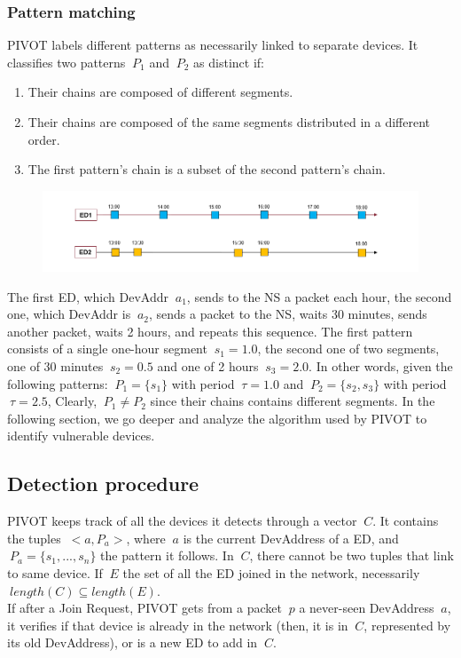 \vspace{5mm} %

\subsubsection{Pattern matching}
PIVOT labels different patterns as necessarily linked to separate devices. It classifies two patterns \(\ P_{1} \) and \(\ P_{2} \) as distinct if:
\begin{enumerate}
	\item Their chains are composed of different segments. 
	\item Their chains are composed of the same segments distributed in a different order.
	\item The first pattern's chain is a subset of the second pattern's chain.
\end{enumerate}
\begin{figure}
    \centering
    \includegraphics[width=0.7\linewidth]{images/pivot/patterns.PNG}
    \caption{}
    \label{fig:patterns}
\end{figure}
The first ED, which DevAddr \(\ a_{1} \), sends to the NS a packet each hour, the second one, which DevAddr is \(\ a_{2} \), sends a packet to the NS, waits 30 minutes, sends another packet, waits 2 hours, and repeats this sequence.  The first pattern consists of a single one-hour segment \(\ s_{1} = 1.0 \), the second one of two segments, one of 30 minutes \(\ s_{2} = 0.5 \) and one of 2 hours \(\ s_{3} = 2.0 \). In other words, given the following patterns: \(\ P_{1} = \{s_{1}\} \) with period \(\ \tau = 1.0 \) and \(\ P_{2} = \{s_{2}, s_{3}\} \) with period \(\ \tau = 2.5 \), Clearly, \(\ P_{1} \neq  P_{2} \) since their chains contains different segments. In the following section, we go deeper and analyze the algorithm used by PIVOT to identify vulnerable devices.

\subsection{Detection procedure}
PIVOT keeps track of all the devices it detects through a vector \(\ C \). It contains the tuples \(\ <a, P_{a}> \), where \(\ a \) is the current DevAddress of a ED, and \(\ P_{a} = \{ s_{1}, ..., s_{n} \} \) the pattern it follows. In \(\ C \), there cannot be two tuples that link to same device. If \(\ E \) the set of all the ED joined in the network, necessarily \(\ length(C) \subseteq length(E ) \). 
\\
If after a Join Request, PIVOT gets from a packet \(\ p \) a never-seen DevAddress \(\ a \), it verifies if that device is already in the network (then, it is in \(\ C \), represented by its old DevAddress), or is a new ED to add in \(\ C \). 


